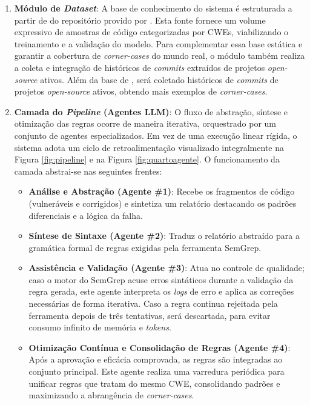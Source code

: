 \documentclass[
    12pt,                %
    openright,           %
    oneside,             %
    a4paper,             %
    english,             %
    brazil               %
]{abntex2}
\begin{document}
\begin{enumerate}
  \item \textbf{Módulo de \textit{Dataset}}:
    A base de conhecimento do sistema é estruturada a partir de do repositório provido por .
Esta fonte fornece um volume expressivo de amostras de código categorizadas por CWEs, viabilizando o treinamento e a validação do modelo.
Para complementar essa base estática e garantir a cobertura de \textit{corner-cases} do mundo real, o módulo também realiza a coleta e integração de históricos de \textit{commits} extraídos de projetos \textit{open-source} ativos.
Além da base de , será coletado históricos de \textit{commits} de projetos \textit{open-source} ativos, obtendo mais exemplos de \textit{corner-cases}.
\item \textbf{Camada do \textit{Pipeline} (Agentes LLM)}: 
  O fluxo de abstração, síntese e otimização das regras ocorre de maneira iterativa, orquestrado por um conjunto de agentes especializados.
  Em vez de uma execução linear rígida, o sistema adota um ciclo de retroalimentação visualizado integralmente na Figura \ref{fig:pipeline} e na Figura \ref{fig:quartoagente}.
  O funcionamento da camada abstrai-se nas seguintes frentes:

  \begin{itemize}
  \item \textbf{Análise e Abstração (Agente \#1)}:
    Recebe os fragmentos de código (vulneráveis e corrigidos) e sintetiza um relatório destacando os padrões diferenciais e a lógica da falha. 
  \item \textbf{Síntese de Sintaxe (Agente \#2)}: 
    Traduz o relatório abstraído para a gramática formal de regras exigidas pela ferramenta SemGrep.
  \item \textbf{Assistência e Validação (Agente \#3)}: 
    Atua no controle de qualidade; caso o motor do SemGrep acuse erros sintáticos durante a validação da regra gerada, este agente interpreta os \textit{logs} de erro e aplica as correções necessárias de forma iterativa.
    Caso a regra continua rejeitada pela ferramenta depois de três tentativas, será descartada, para evitar consumo infinito de memória e \textit{tokens}.
  \item \textbf{Otimização Contínua e Consolidação de Regras (Agente \#4)}:
    Após a aprovação e eficácia comprovada, as regras são integradas ao conjunto principal.
    Este agente realiza uma varredura periódica para unificar regras que tratam do mesmo CWE, consolidando padrões e maximizando a abrangência de \textit{corner-cases}.
  \end{itemize}
\end{enumerate}
\end{document}
